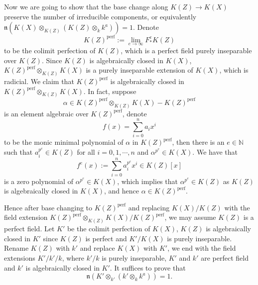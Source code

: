\documentclass[letterpaper,reqno,12pt]{amsart}
\numberwithin{equation}{section}
\theoremstyle{plain}
\begin{document}
Now we are going to show that the base change along $K(Z)\to K(X)$ preserve the number of irreducible components, or equivalently $\mathfrak n(K(X)\otimes_{K(Z)}(K(Z)\otimes_kk^a))=1$. Denote 
\[K(Z)^\text{perf}:=\lim\limits_{e\to\infty} F^e_* K(Z)\]
to be the colimit perfection of $K(Z)$, which is a perfect field purely inseparable over $K(Z)$. Since $K(Z)$ is algebraically closed in $K(X)$, $K(Z)^\text{perf}\otimes_{K(Z)} K(X)$ is a purely inseparable extension of $K(X)$, which is radicial. We claim that $K(Z)^\text{perf}$ is algebraically closed in $K(Z)^\text{perf}\otimes_{K(Z)} K(X)$. In fact, suppose 
\[\alpha\in K(Z)^\text{perf}\otimes_{K(Z)} K(X)-K(Z)^\text{perf}\]
is an element algebraic over $K(Z)^\text{perf}$, denote \[f(x)=\sum\limits_{i=0}^n a_ix^i\] to be the monic minimal polynomial of $\alpha$ in $K(Z)^\text{perf}$, then there is an $e\in\mathbb N$ such that $a_i^{p^e}\in K(Z)$ for all $i=0,1,\cdots, n$ and $\alpha^{p^e}\in K(X)$. We have that \[f^e(x):=\sum\limits_{i=0}^n a_i^{p^e}x^i\in K(Z)[x]\] is a zero polynomial of $\alpha^{p^e}\in K(X)$, which implies that $\alpha^{p^e}\in K(Z)$ as $K(Z)$ is algebraically closed in $K(X)$, and hence $\alpha\in K(Z)^\text{perf}$. 

Hence after base changing to $K(Z)^\text{perf}$ and replacing $K(X)/K(Z)$ with the field extension $K(Z)^\text{perf}\otimes_{K(Z)} K(X)/K(Z)^\text{perf}$, we may assume $K(Z)$ is a perfect field. Let $K'$ be the colimit perfection of $K(X)$, $K(Z)$ is algebraically closed in $K'$ since $K(Z)$ is perfect and $K'/K(X)$ is purely inseparable. Rename $K(Z)$ with $k'$ and replace $K(X)$ with $K'$, we end with the field extensions $K'/k'/k$, where $k'/k$ is purely inseparable, $K'$ and $k'$ are perfect field and $k'$ is algebraically closed in $K'$. It suffices to prove that \[\mathfrak n(K'\otimes_{k'}(k'\otimes_kk^a))=1.\]
\end{document}
